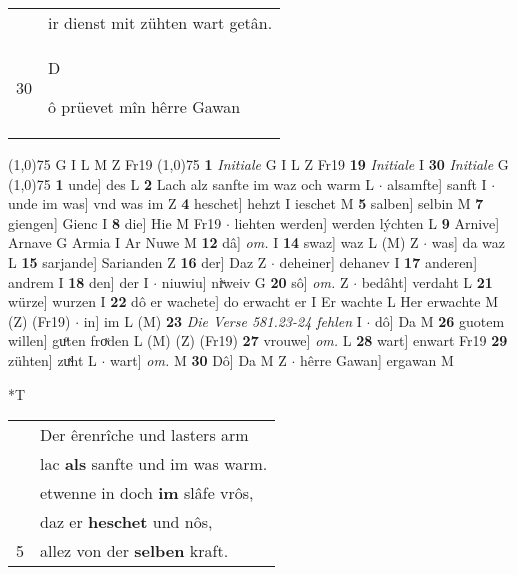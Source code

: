 \documentclass[8pt,a4paper,notitlepage]{article}
\begin{document}
\begin{table}[ht]
\begin{minipage}[t]{0.5\linewidth}
\begin{tabular}{rl}
 & ir dienst mit zühten wart getân.\\ 
30 & \begin{large}D\end{large}ô prüevet mîn hêrre Gawan\\ 
\end{tabular}
\scriptsize
\line(1,0){75} \newline
G I L M Z Fr19 \newline
\line(1,0){75} \newline
\textbf{1} \textit{Initiale} G I L Z Fr19  \textbf{19} \textit{Initiale} I  \textbf{30} \textit{Initiale} G  \newline
\line(1,0){75} \newline
\textbf{1} unde] des L \textbf{2} Lach alz sanfte im waz och warm L  $\cdot$ alsamfte] sanft I  $\cdot$ unde im was] vnd was im Z \textbf{4} heschet] hehzt I ieschet M \textbf{5} salben] selbin M \textbf{7} giengen] Gienc I \textbf{8} die] Hie M Fr19  $\cdot$ liehten werden] werden lýchten L \textbf{9} Arnive] Arnave G Armia I Ar Nuwe M \textbf{12} dâ] \textit{om.} I \textbf{14} swaz] waz L (M) Z  $\cdot$ was] da waz L \textbf{15} sarjande] Sarianden Z \textbf{16} der] Daz Z  $\cdot$ deheiner] dehanev I \textbf{17} anderen] andrem I \textbf{18} den] der I  $\cdot$ niuwiu] niͮweiv G \textbf{20} sô] \textit{om.} Z  $\cdot$ bedâht] verdaht L \textbf{21} würze] wurzen I \textbf{22} dô er wachete] do erwacht er I Er wachte L Her erwachte M (Z) (Fr19)  $\cdot$ in] im L (M) \textbf{23} \textit{Die Verse 581.23-24 fehlen} I   $\cdot$ dô] Da M \textbf{26} guotem willen] guͦten froͮden L (M) (Z) (Fr19) \textbf{27} vrouwe] \textit{om.} L \textbf{28} wart] enwart Fr19 \textbf{29} zühten] zuͯht L  $\cdot$ wart] \textit{om.} M \textbf{30} Dô] Da M Z  $\cdot$ hêrre Gawan] ergawan M \newline
\end{minipage}
\hspace{0.5cm}
\begin{minipage}[t]{0.5\linewidth}
\small
\begin{center}*T
\end{center}
\begin{tabular}{rl}
 & Der êrenrîche und lasters arm\\ 
 & lac \textbf{als} sanfte und im was warm.\\ 
 & etwenne in doch \textbf{im} slâfe vrôs,\\ 
 & daz er \textbf{heschet} und nôs,\\ 
5 & allez von der \textbf{selben} kraft.\\ 

\end{tabular}
\end{minipage}
\end{table}
\end{document}
